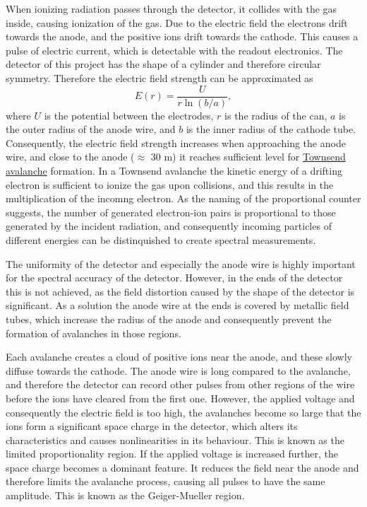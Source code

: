 \documentclass[a4paper]{article}
\begin{document}
When ionizing radiation passes through the detector, it collides with the gas inside, causing ionization of the gas.
Due to the electric field the electrons drift towards the anode, and the positive ions drift towards the cathode.
This causes a pulse of electric current, which is detectable with the readout electronics.
The detector of this project has the shape of a cylinder and therefore circular symmetry.
Therefore the electric field strength can be approximated as
\begin{equation}
E(r) = \frac{U}{r \ln(b/a) },
\end{equation}
where $U$ is the potential between the electrodes, $r$ is the radius of the can, $a$ is the outer radius of the anode wire, and $b$ is the inner radius of the cathode tube.
Consequently, the electric field strength increases when approaching the anode wire, and close to the anode ($\approx$ 30 \textmu m) it reaches sufficient level for
\href{https://en.wikipedia.org/wiki/Townsend_discharge}{Townsend avalanche} formation.
In a Townsend avalanche the kinetic energy of a drifting electron is sufficient to ionize the gas upon collisions, and this results in the multiplication of the incomng electron.
As the naming of the proportional counter suggests, the number of generated electron-ion pairs is proportional to those generated by the incident radiation, and consequently incoming particles of different energies can be distinquished to create spectral measurements.
\cites{winkler_gaseous_2015}[p. 159--164]{knoll_radiation_2010}

The uniformity of the detector and especially the anode wire is highly important for the spectral accuracy of the detector.
However, in the ends of the detector this is not achieved, as the field distortion caused by the shape of the detector is significant.
As a solution the anode wire at the ends is covered by metallic field tubes, which increase the radius of the anode and consequently prevent the formation of avalanches in those regions.
\cite[p. 165]{knoll_radiation_2010}

Each avalanche creates a cloud of positive ions near the anode, and these slowly diffuse towards the cathode.
The anode wire is long compared to the avalanche, and therefore the detector can record other pulses from other regions of the wire before the ions have cleared from the first one.
However, the applied voltage and consequently the electric field is too high, the avalanches become so large that the ions form a significant space charge in the detector, which alters its characteristics and causes nonlinearities in its behaviour.
This is known as the limited proportionality region.
If the applied voltage is increased further, the space charge becomes a dominant feature.
It reduces the field near the anode and therefore limits the avalanche process, causing all pulses to have the same amplitude.
This is known as the Geiger-Mueller region.
\cite[p. 160--161]{knoll_radiation_2010}
\end{document}
